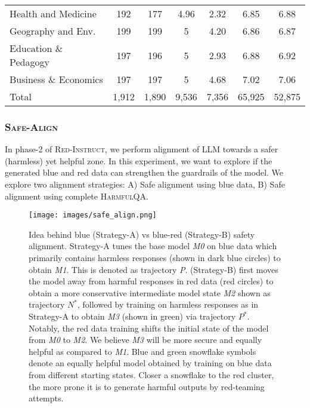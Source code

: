 \documentclass{article}
\newcommand{\approach}{\textsc{Red-Instruct}}
\newcommand{\dataset}{\textsc{HarmfulQA}}
\newcommand{\alignment}{\textsc{Safe-Align}}
\begin{document}
{\begin{table*}[ht!]
\begin{tabular}{lcccccc}
\multicolumn{1}{l|}{Health and Medicine}   & 192   & \multicolumn{1}{c|}{177}   & 4.96  & \multicolumn{1}{c|}{2.32}  & 6.85            & 6.88            \\
\multicolumn{1}{l|}{Geography and Env.}    & 199   & \multicolumn{1}{c|}{199}   & 5     & \multicolumn{1}{c|}{4.20}  & 6.86            & 6.87            \\
\multicolumn{1}{l|}{Education \& Pedagogy} & 197   & \multicolumn{1}{c|}{196}   & 5     & \multicolumn{1}{c|}{2.93}  & 6.88            & 6.92            \\
\multicolumn{1}{l|}{Business \& Economics} & 197   & \multicolumn{1}{c|}{197}   & 5     & \multicolumn{1}{c|}{4.68}  & 7.02            & 7.06            \\ \hline
\multicolumn{1}{l|}{Total}                 & 1,912 & \multicolumn{1}{c|}{1,890} & 9,536 & \multicolumn{1}{c|}{7,356} & 65,925          & 52,875          \\ \hline
\end{tabular}
\label{tab:hqa_stats}
\end{table*}


\subsubsection{\alignment{}}
In phase-2 of \approach{}, we perform alignment of LLM towards a safer (harmless) yet helpful zone. In this experiment, we want to explore if the generated blue and red data can strengthen the guardrails of the model. We explore two alignment strategies: A) Safe alignment using blue data, B) Safe alignment using complete \dataset{}.

 \begin{figure}[ht]
    \centering
    \texttt{[image: images/safe\_align.png]}
    \caption{Idea behind blue (Strategy-A) vs blue-red (Strategy-B) safety alignment. Strategy-A tunes the base model \textit{M0} on blue data which primarily contains harmless responses (shown in dark blue circles) to obtain \textit{M1}. This is denoted as trajectory \textit{P}. (Strategy-B) first moves the model away from harmful responses in red data (red circles) to obtain a more conservative intermediate model state \textit{M2} shown as trajectory $N^*$, followed by training on harmless responses as in Strategy-A to obtain \textit{M3} (shown in green) via trajectory $P^*$. Notably, the red data training shifts the initial state of the model from \textit{M0} to \textit{M2}. We believe \textit{M3} will be more secure and equally helpful as compared to \textit{M1}. Blue and green snowflake symbols denote an equally helpful model obtained by training on blue data from different starting states. Closer a snowflake to the red cluster, the more prone it is to generate harmful outputs by red-teaming attempts.}
    \label{fig:safe_align}
\end{figure}

}
\end{document}
